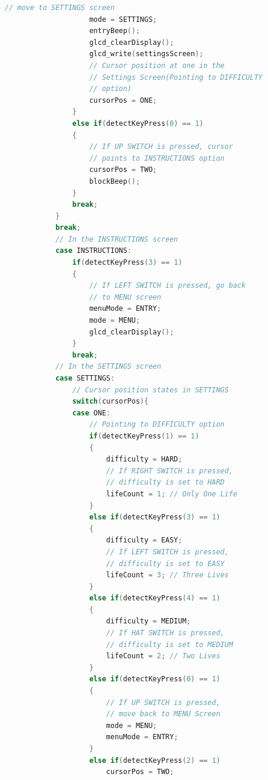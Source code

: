 \documentclass{article}
\begin{document}
\begin{lstlisting}[basicstyle = \small, language = C]
                    // move to SETTINGS screen
                    mode = SETTINGS;
                    entryBeep();
                    glcd_clearDisplay();
                    glcd_write(settingsScreen);
                    // Cursor position at one in the 
                    // Settings Screen(Pointing to DIFFICULTY 
                    // option)
                    cursorPos = ONE;
                }
                else if(detectKeyPress(0) == 1)
                {
                    // If UP SWITCH is pressed, cursor 
                    // points to INSTRUCTIONS option
                    cursorPos = TWO;
                    blockBeep();
                }
                break;
            }
            break;
            // In the INSTRUCTIONS screen
            case INSTRUCTIONS:
                if(detectKeyPress(3) == 1)
                {
                    // If LEFT SWITCH is pressed, go back 
                    // to MENU screen
                    menuMode = ENTRY;
                    mode = MENU;
                    glcd_clearDisplay();
                }
                break;
            // In the SETTINGS screen
            case SETTINGS:
                // Cursor position states in SETTINGS
                switch(cursorPos){
                case ONE:
                    // Pointing to DIFFICULTY option
                    if(detectKeyPress(1) == 1)
                    {
                        difficulty = HARD; 
                        // If RIGHT SWITCH is pressed, 
                        // difficulty is set to HARD
                        lifeCount = 1; // Only One Life
                    }
                    else if(detectKeyPress(3) == 1)
                    {
                        difficulty = EASY; 
                        // If LEFT SWITCH is pressed,
                        // difficulty is set to EASY
                        lifeCount = 3; // Three Lives
                    }
                    else if(detectKeyPress(4) == 1)
                    {
                        difficulty = MEDIUM; 
                        // If HAT SWITCH is pressed, 
                        // difficulty is set to MEDIUM
                        lifeCount = 2; // Two Lives
                    }
                    else if(detectKeyPress(0) == 1)
                    {
                        // If UP SWITCH is pressed, 
                        // move back to MENU Screen
                        mode = MENU;
                        menuMode = ENTRY;
                    }
                    else if(detectKeyPress(2) == 1)
                        cursorPos = TWO; 

\end{lstlisting}
\end{document}
